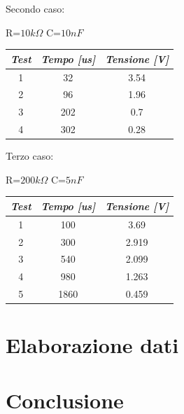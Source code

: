     \begin{center}
        Secondo caso: \par
        R=$10k\Omega$ C=$10nF$
    \end{center}
    \begin{center}
    \begin{tabular}{|c|c|c|}
        \hline
        \textit{Test} & \textit{Tempo [us]} & \textit{Tensione [V]} \\
        \hline
        1 & 32 & 3.54 \\
        \hline
        2 & 96 & 1.96 \\
        \hline
        3 & 202 & 0.7 \\
        \hline
        4 & 302 & 0.28 \\
        \hline
    
    \end{tabular}
    \end{center}

    \begin{center}
        Terzo caso: \par
        R=$200k\Omega$ C=$5nF$
    \end{center}
    \begin{center}
    \begin{tabular}{|c|c|c|}
        \hline
        \textit{Test} & \textit{Tempo [us]} & \textit{Tensione [V]} \\
        \hline
        1 & 100 & 3.69 \\
        \hline
        2 & 300 & 2.919 \\
        \hline
        3 & 540 & 2.099 \\
        \hline
        4 & 980 & 1.263 \\
        \hline
        5 & 1860 & 0.459 \\
        \hline
    
    \end{tabular}
    \end{center}

    \section{Elaborazione dati}

    
    \section{Conclusione}
    
